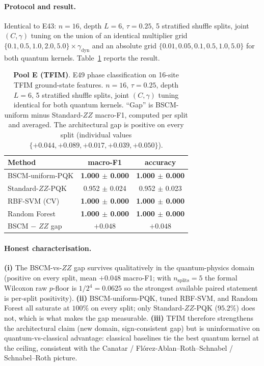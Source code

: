 \documentclass[pdflatex,sn-mathphys]{sn-jnl}
\theoremstyle{plain}
\theoremstyle{remark}
\theoremstyle{definition}
\begin{document}
\paragraph{Protocol and result.}
Identical to E43: $n=16$, depth $L=6$, $\tau=0.25$, 5 stratified shuffle splits, joint $(C, \gamma)$ tuning on the union of an identical multiplier grid $\{0.1, 0.5, 1.0, 2.0, 5.0\}\times\gamma_\text{dyn}$ and an absolute grid $\{0.01, 0.05, 0.1, 0.5, 1.0, 5.0\}$ for both quantum kernels.  Table~\ref{tab:e49} reports the result.

\begin{table}[htbp]
\caption{\textbf{Pool E (TFIM)}. E49 phase classification on 16-site TFIM ground-state features.  $n=16$, $\tau=0.25$, depth $L=6$, 5 stratified shuffle splits, joint $(C, \gamma)$ tuning identical for both quantum kernels.  ``Gap'' is BSCM-uniform minus Standard-$ZZ$ macro-F1, computed per split and averaged.  The architectural gap is positive on every split (individual values $\{+0.044, +0.089, +0.017, +0.039, +0.050\}$).}
\label{tab:e49}
\begin{tabular}{lcc}
\toprule
Method                 & macro-F1            & accuracy \\
\midrule
BSCM-uniform-PQK       & \textbf{1.000 $\pm$ 0.000} & \textbf{1.000 $\pm$ 0.000} \\
Standard-$ZZ$-PQK      & 0.952 $\pm$ 0.024  & 0.952 $\pm$ 0.023 \\
RBF-SVM (CV)           & \textbf{1.000 $\pm$ 0.000} & \textbf{1.000 $\pm$ 0.000} \\
Random Forest          & \textbf{1.000 $\pm$ 0.000} & \textbf{1.000 $\pm$ 0.000} \\
\midrule
BSCM $-$ $ZZ$ gap      & $+0.048$           & $+0.048$ \\
\bottomrule
\end{tabular}
\end{table}

\paragraph{Honest characterisation.}
\textbf{(i)} The BSCM-vs-$ZZ$ gap survives qualitatively in the quantum-physics domain (positive on every split, mean $+0.048$ macro-F1; with $n_{\text{splits}}\!=\!5$ the formal Wilcoxon raw $p$-floor is $1/2^4=0.0625$ so the strongest available paired statement is per-split positivity).  \textbf{(ii)} BSCM-uniform-PQK, tuned RBF-SVM, and Random Forest all saturate at $100\%$ on every split; only Standard-$ZZ$-PQK ($95.2\%$) does not, which is what makes the gap measurable.  \textbf{(iii)} TFIM therefore strengthens the architectural claim (new domain, sign-consistent gap) but is uninformative on quantum-vs-classical advantage: classical baselines tie the best quantum kernel at the ceiling, consistent with the Canatar / Fl{\'o}rez-Ablan--Roth--Schnabel / Schnabel--Roth picture.
\end{document}
